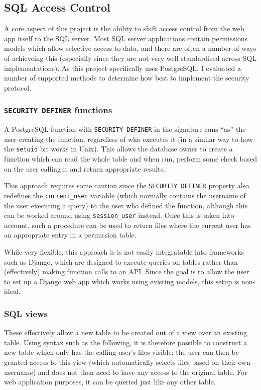 \documentclass{article}
\begin{document}
\subsection{SQL Access Control}
A core aspect of this project is the ability to shift access control from the web app itself to the SQL server. Most SQL server applications contain permissions models which allow selective access to data, and there are often a number of ways of achieveing this (especially since they are not very well standardised across SQL implementations). As this project specifically uses PostgreSQL, I evaluated a number of supported methods to determine how best to implement the security protocol.

\subsubsection{\texttt{SECURITY DEFINER} functions}
A PostgreSQL function with \texttt{SECURITY DEFINER} in the signature runs ``as'' the user creating the function, regardless of who executes it\cite{postgres-SEC_DEF} (in a similar way to how the \texttt{setuid} bit works in Unix). This allows the database owner to create a function which can read the whole table and when run, perform some check based on the user calling it and return appropriate results.

This approach requires some caution since the \texttt{SECURITY DEFINER} property also redefines the \verb+current_user+ variable (which normally contains the username of the user executing a query) to the user who defined the function, although this can be worked around using \verb+session_user+ instead. Once this is taken into account, such a procedure can be used to return files where the current user has an appropriate entry in a permission table.

While very flexible, this approach is is not easily integratable into frameworks such as Django, which are designed to execute queries on tables rather than (effectively) making function calls to an API. Since the goal is to allow the user to set up a Django web app which works using existing models, this setup is non-ideal.

\subsubsection{SQL views}
These effectively allow a new table to be created out of a view over an existing table. Using syntax such as the following, it is therefore possible to construct a new table which only has the calling user's files visible; the user can then be granted access to this view (which automatically selects files based on their own username) and does not then need to have any access to the original table. For web application purposes, it can be queried just like any other table.
\end{document}

